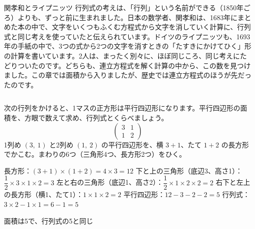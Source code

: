 \begin{column}{関孝和とライプニッツ}
行列式の考えは、「行列」という名前ができる（1850年ごろ）よりも、ずっと前に生まれました。日本の数学者、関孝和は、1683年にまとめた本の中で、文字をいくつもふくむ方程式から文字を消していく計算に、行列式と同じ考えを使っていたと伝えられています。ドイツのライプニッツも、1693年の手紙の中で、3つの式から2つの文字を消すときの「たすきにかけてひく」形の計算を書いています。2人は、まったく別々に、ほぼ同じころ、同じ考えにたどりついたのです。どちらも、連立方程式を解く計算の中から、この数を見つけました。この章では面積から入りましたが、歴史では連立方程式のほうが先だったのです。
\end{column}


\begin{reidai}[方眼で面積を数える]
次の行列をかけると、1マスの正方形は平行四辺形になります。平行四辺形の面積を、方眼で数えて求め、行列式とくらべましょう。
\[ \begin{pmatrix}3&1\\1&2\end{pmatrix} \]
\kangaekata 1列め $(3,\ 1)$ と2列め $(1,\ 2)$ の平行四辺形を、横 $3+1$、たて $1+2$ の長方形でかこむ。まわりの6つ（三角形4つ、長方形2つ）をひく。\par
\shiki 長方形：$(3+1)\times(1+2)=4\times3=12$\kviieq
下と上の三角形（底辺3、高さ1）：$\dfrac{1}{2}\times3\times1\times2=3$\kviieq
左と右の三角形（底辺1、高さ2）：$\dfrac{1}{2}\times1\times2\times2=2$\kviieq
右下と左上の長方形（横1、たて1）：$1\times1\times2=2$\kviieq
平行四辺形：$12-3-2-2=5$\kviieq
行列式：$3\times2-1\times1=6-1=5$\par
\kotae 面積は5で、行列式の5と同じ
\end{reidai}
\noindent\begin{minipage}[c]{0.5\linewidth}\centering
{}
\end{minipage}\hfill
